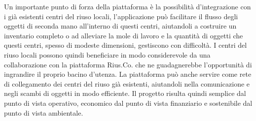 \begin{figure}[hb]
    \hfill
    \hfill
    \hfill
\end{figure}
\clearpage

Un importante punto di forza della piattaforma è la possibilità d'integrazione con i già esistenti centri del riuso locali, l'applicazione può facilitare il flusso degli oggetti di seconda mano all'interno di questi centri, aiutandoli a costruire un inventario completo o ad alleviare la mole di lavoro e la quantità di oggetti che questi centri, spesso di modeste dimensioni, gestiscono con difficoltà. I centri del riuso locali possono quindi beneficiare in modo considerevole da una collaborazione con la piattaforma Rius.Co. che ne guadagnerebbe l'opportunità di ingrandire il proprio bacino d'utenza. 
La piattaforma può anche servire come rete di collegamento dei centri del riuso già esistenti, aiutandoli nella comunicazione e negli scambi di oggetti in modo efficiente. Il progetto risulta quindi semplice dal punto di vista operativo, economico dal punto di vista finanziario e sostenibile dal punto di vista ambientale. 
\medskip

